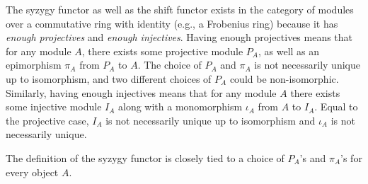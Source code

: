The syzygy functor as well as the shift functor exists in the category of modules over a commutative ring with identity (e.g., a Frobenius ring) because it has \emph{enough projectives} and \emph{enough injectives}. Having enough projectives means that for any module \( A \), there exists some projective module \( P_A \), as well as an epimorphism \( \pi_A \) from \( P_A \) to \( A \). The choice of \( P_A \) and \( \pi_A \) is not necessarily unique up to isomorphism, and two different choices of \( P_A \) could be non-isomorphic. Similarly, having enough injectives means that for any module \( A \) there exists some injective module \( I_A \) along with a monomorphism \( \iota_A \) from \( A \) to \( I_A \). Equal to the projective case, \( I_A \) is not necessarily unique up to isomorphism and \( \iota_A \) is not necessarily unique.

The definition of the syzygy functor is closely tied to a choice of \( P_A \)'s and \( \pi_A \)'s for every object \( A \).


